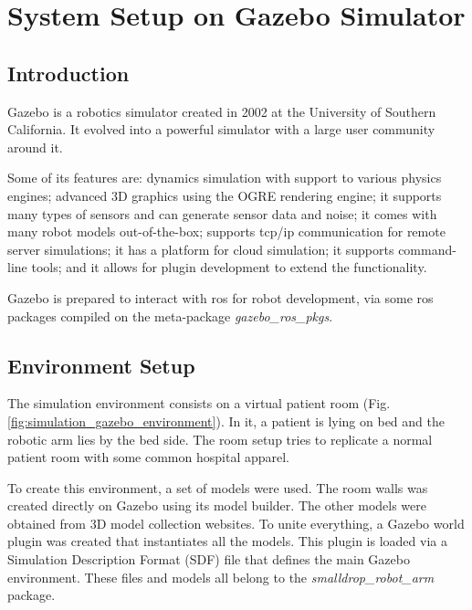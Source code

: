 \chapter{System Setup on Gazebo Simulator}
\label{app:gazebo_setup}

\section{Introduction}
\label{sec:gazebo_setup_introduction}

Gazebo is a robotics simulator created in 2002 at the University of Southern California. It evolved into a powerful simulator with a large user community around it.

Some of its features are: dynamics simulation with support to various physics engines; advanced 3D graphics using the OGRE rendering engine; it supports many types of sensors and can generate sensor data and noise; it comes with many robot models out-of-the-box; supports tcp/ip communication for remote server simulations; it has a platform for cloud simulation; it supports command-line tools; and it allows for plugin development to extend the functionality.

Gazebo is prepared to interact with \gls{ros} for robot development, via some \gls{ros} packages compiled on the meta-package \textit{gazebo\_ros\_pkgs}.


\section{Environment Setup}
\label{sec:gazebo_setup_environment}

The simulation environment consists on a virtual patient room (Fig. \ref{fig:simulation_gazebo_environment}). In it, a patient is lying on bed and the robotic arm lies by the bed side. The room setup tries to replicate a normal patient room with some common hospital apparel.

To create this environment, a set of models were used. The room walls was created directly on Gazebo using its model builder. The other models were obtained from 3D model collection websites. To unite everything, a Gazebo world plugin was created that instantiates all the models. This plugin is loaded via a Simulation Description Format (SDF) file that defines the main Gazebo environment. These files and models all belong to the \textit{smalldrop\_robot\_arm} package.

